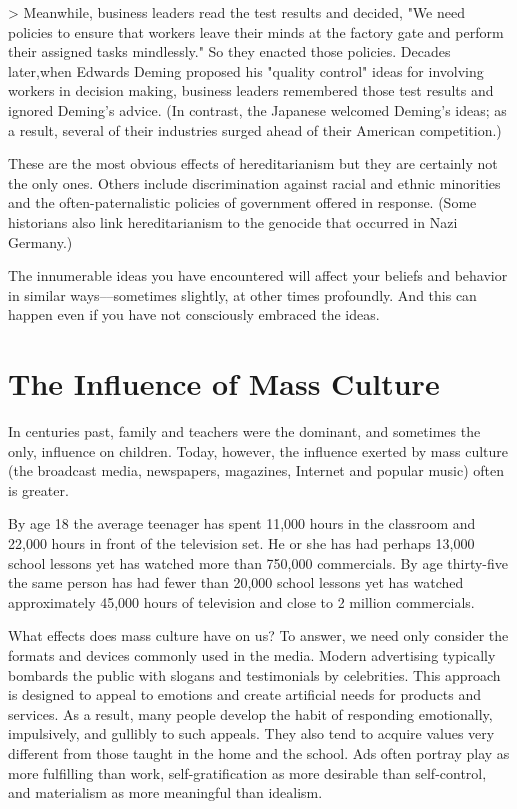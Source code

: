 \documentclass{book}
\begin{document}
> Meanwhile, business leaders read the test results and decided, "We need policies to ensure that workers leave their minds at the factory gate and perform their assigned tasks mindlessly." So they enacted those policies. Decades later,when Edwards Deming proposed his "quality control" ideas for involving workers in decision making, business leaders remembered those test results and ignored Deming’s advice. (In contrast, the Japanese welcomed Deming’s ideas; as a result, several of their industries surged ahead of their American competition.)

These are the most obvious effects of hereditarianism but they are certainly not the only ones. Others include discrimination against racial and ethnic minorities and the often-paternalistic policies of government offered in response. (Some historians also link hereditarianism to the genocide that occurred in Nazi Germany.)

The innumerable ideas you have encountered will affect your beliefs and behavior in similar ways––sometimes slightly, at other times profoundly. And this can happen even if you have not consciously embraced the ideas.

\section{The Influence of Mass Culture}

In centuries past, family and teachers were the dominant, and sometimes the only, influence on children. Today, however, the influence exerted by mass culture (the broadcast media, newspapers, magazines, Internet and popular music) often is greater.

By age 18 the average teenager has spent 11,000 hours in the classroom and 22,000 hours in front of the television set. He or she has had perhaps 13,000 school lessons yet has watched more than 750,000 commercials. By age thirty-five the same person has had fewer than 20,000 school lessons yet has watched approximately 45,000 hours of television and close to 2 million commercials.

What effects does mass culture have on us? To answer, we need only consider the formats and devices commonly used in the media. Modern advertising typically bombards the public with slogans and testimonials by celebrities. This approach is designed to appeal to emotions and create artificial needs for products and services. As a result, many people develop the habit of responding emotionally, impulsively, and gullibly to such appeals. They also tend to acquire values very different from those taught in the home and the school. Ads often portray play as more fulfilling than work, self-gratification as more desirable than self-control, and materialism as more meaningful than idealism.
\end{document}

